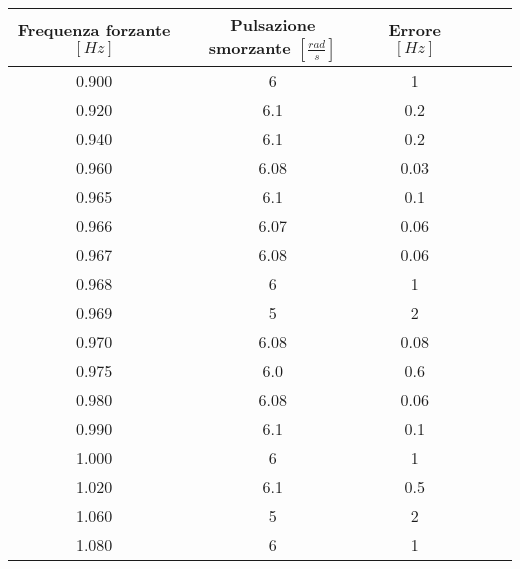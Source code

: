 \begin{tabular}{cccccc}
\toprule
Frequenza forzante $[Hz]$  & Pulsazione smorzante $[\frac{rad}{s}]$ & Errore $[Hz]$\\ \midrule
0.900 & 6 & 1\\ \midrule
0.920 & 6.1 & 0.2\\ \midrule
0.940 & 6.1 & 0.2\\ \midrule
0.960 & 6.08 & 0.03\\ \midrule
0.965 & 6.1 & 0.1\\ \midrule
0.966 & 6.07 & 0.06\\ \midrule
0.967 & 6.08 & 0.06\\ \midrule
0.968 & 6 & 1\\ \midrule
0.969 & 5 & 2\\ \midrule
0.970 & 6.08 & 0.08\\ \midrule
0.975 & 6.0 & 0.6\\ \midrule
0.980 & 6.08 & 0.06\\ \midrule
0.990 & 6.1 & 0.1\\ \midrule
1.000 & 6 & 1\\ \midrule
1.020 & 6.1 & 0.5\\ \midrule
1.060 & 5 & 2\\ \midrule
1.080 & 6 & 1\\ \bottomrule
\end{tabular}
